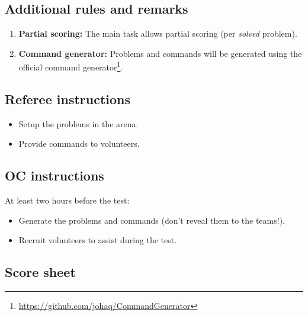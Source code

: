\subsection*{Additional rules and remarks}
\begin{enumerate}[nosep]
	\item \textbf{Partial scoring:} The main task allows partial scoring (per \emph{solved} problem).

	\item \textbf{Command generator:} Problems and commands will be generated using the official command generator\footnote{\url{https://github.com/johaq/CommandGenerator}}.
\end{enumerate}

\subsection*{Referee instructions}
\begin{itemize}
	\item Setup the problems in the arena.
	\item Provide commands to volunteers.
\end{itemize}

\subsection*{OC instructions}

At least two hours before the test:
\begin{itemize}
	\item Generate the problems and commands (don't reveal them to the teams!).
	\item Recruit volunteers to assist during the test.
\end{itemize}


\subsection*{Score sheet}


